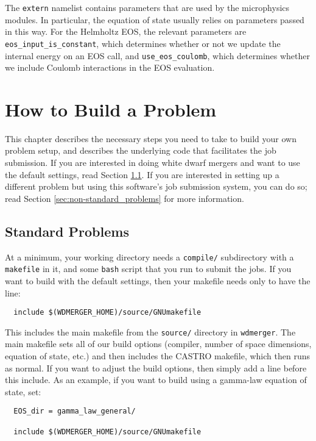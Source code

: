 \documentclass[12pt]{book}
\begin{document}
The \texttt{extern} namelist contains parameters that are used by the microphysics modules. In particular, 
the equation of state usually relies on parameters passed in this way. For the Helmholtz EOS, the relevant 
parameters are \texttt{eos\_input\_is\_constant}, which determines whether or not we update the internal 
energy on an EOS call, and \texttt{use\_eos\_coulomb}, which determines whether we include Coulomb 
interactions in the EOS evaluation.

\chapter{How to Build a Problem}

This chapter describes the necessary steps you need to take to build your own problem setup,
and describes the underlying code that facilitates the job submission. If you are interested in
doing white dwarf mergers and want to use the default settings, read Section \ref{sec:standard_problems}.
If you are interested in setting up a different problem but using this software's job submission 
system, you can do so; read Section \ref{sec:non-standard_problems} for more information.

\section{Standard Problems}
\label{sec:standard_problems}

At a minimum, your working directory needs a \texttt{compile/} subdirectory with a \texttt{makefile}
in it, and some \texttt{bash} script that you run to submit the jobs. If you want to build 
with the default settings, then your makefile needs only to have the line:
\begin{lstlisting}
  include $(WDMERGER_HOME)/source/GNUmakefile
\end{lstlisting}%
This includes the main makefile from the \texttt{source/} directory in \texttt{wdmerger}. 
The main makefile sets all of our build options (compiler, number of space dimensions, 
equation of state, etc.) and then includes the CASTRO makefile, which then runs as normal.
If you want to adjust the build options, then simply add a line before this include. As an 
example, if you want to build using a gamma-law equation of state, set:
\begin{lstlisting}
  EOS_dir = gamma_law_general/

  include $(WDMERGER_HOME)/source/GNUmakefile 
\end{lstlisting}%
\end{document}
